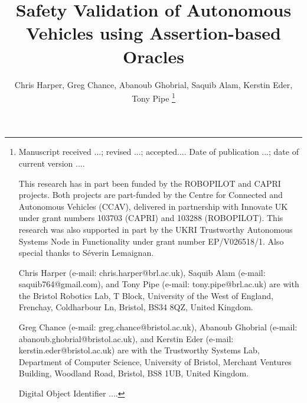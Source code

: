 \documentclass[letterpaper, 10 pt, journal, twoside]{IEEEtran}
\newcommand{\pathToSourceFiles}{../source}
\begin{document}
\title{Safety Validation of Autonomous Vehicles using Assertion-based Oracles}

\author{Chris Harper, Greg Chance, Abanoub Ghobrial, Saquib Alam, Kerstin Eder, Tony Pipe 
\thanks{{\footnotesize
Manuscript  
received ...;
revised ...;  
accepted.... 
Date of publication ...;
date of current version ....

This research has in part been funded by the ROBOPILOT and CAPRI projects. Both projects are part-funded by the Centre for Connected and Autonomous Vehicles (CCAV), delivered in partnership with Innovate UK under grant numbers 103703 (CAPRI) and 103288 (ROBOPILOT). This research was also supported in part by the UKRI Trustworthy Autonomous Systems Node in Functionality under grant number EP/V026518/1. Also special thanks to S\'everin Lemaignan.


Chris Harper (e-mail: chris.harper@brl.ac.uk),
Saquib Alam (e-mail: saquib764@gmail.com),
and
Tony Pipe (e-mail: tony.pipe@brl.ac.uk) 
are with the Bristol Robotics Lab, T Block, University of the West of England, Frenchay, Coldharbour Ln, Bristol, BS34 8QZ, United Kingdom. 

Greg Chance (e-mail: greg.chance@bristol.ac.uk), 
Abanoub Ghobrial (e-mail: abanoub.ghobrial@bristol.ac.uk), 
and 
Kerstin Eder (e-mail: kerstin.eder@bristol.ac.uk) 
are with the Trustworthy Systems Lab, Department of Computer Science, University of Bristol, Merchant Ventures Building, Woodland Road, Bristol, BS8 1UB, United Kingdom. 

Digital Object Identifier ....
}}}
%
%
\maketitle

\begin{abstract}
\noindent 

\end{abstract}
\end{document}
